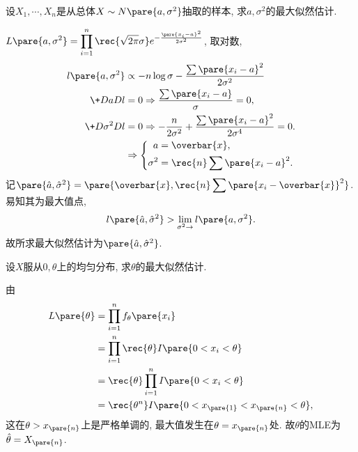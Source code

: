 \documentclass{ctexart}
\begin{document}
\begin{sample}
    \begin{ex}
        设$X_1, \cdots, X_n$是从总体$X\sim N\pare{a,\sigma^2}$抽取的样本, 求$a, \sigma^2$的最大似然估计.
    \end{ex}
    \begin{solution}
        $\displaystyle L\pare{a,\sigma^2} = \prod_{i=1}^n \rec{\sqrt{2\pi}\sigma} e^{-\frac{\pare{x_i-a}^2}{2\sigma^2}}$, 取对数,
        \begin{align*}
            l\pare{a,\sigma^2} &\propto -n\log \sigma - \frac{\sum \pare{x_i - a}^2}{2\sigma^2} \\
            \+DaDl &= 0 \Rightarrow \frac{\sum \pare{x_i - a}}{\sigma} = 0, \\
            \+D{\sigma^2}Dl &= 0 \Rightarrow -\frac{n}{2\sigma^2} + \frac{\sum\pare{x_i - a}^2}{2\sigma^4} = 0. \\
            &\Rightarrow \left\{\begin{aligned}
                a &= \overbar{x}, \\
                \sigma^2 &= \rec{n} \sum\pare{x_i-a}^2.
            \end{aligned}\right.
        \end{align*}
        记$\pare{\hat{a}, \hat{\sigma}^2} = \displaystyle \pare{\overbar{x}, \rec{n} \sum\pare{x_i - \overbar{x}}^2}$. 易知其为最大值点,
        \[ l\pare{\hat{a}, \hat{\sigma}^2} > \lim_{\sigma^2\rightarrow} l\pare{a,\sigma^2}. \]
        故所求最大似然估计为$\pare{\hat{a}, \hat{\sigma}^2}$.
    \end{solution}
\end{sample}
\begin{sample}
    \begin{ex}
        设$X$服从$0,\theta$上的均匀分布, 求$\theta$的最大似然估计.
    \end{ex}
    \begin{solution}
        由
        \begin{align*}
            L\pare{\theta} &= \prod_{i=1}^n f_\theta\pare{x_i} \\
            &= \prod_{i=1}^n \rec{\theta} I\pare{0<x_i<\theta} \\
            &= \rec{\theta} \prod_{i=1}^n I\pare{0<x_i<\theta} \\
            &= \rec{\theta^n} I\pare{0 < x_{\pare{1}} < x_{\pare{n}} < \theta},
        \end{align*}
        这在$\theta>x_{\pare{n}}$上是严格单调的, 最大值发生在$\theta = x_{\pare{n}}$处. 故$\theta$的MLE为$\hat\theta = X_{\pare{n}}$.
    \end{solution}
\end{sample}
\end{document}
